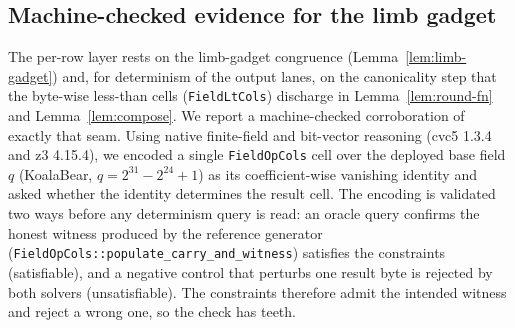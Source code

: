 


\subsection{Machine-checked evidence for the limb gadget}\label{app:machine-check}

The per-row layer rests on the limb-gadget congruence
(Lemma~\ref{lem:limb-gadget}) and, for determinism of the output lanes, on the
canonicality step that the byte-wise less-than cells (\texttt{FieldLtCols})
discharge in Lemma~\ref{lem:round-fn} and Lemma~\ref{lem:compose}. We report a
machine-checked corroboration of exactly that seam. Using native
finite-field and bit-vector reasoning (cvc5 1.3.4 and z3 4.15.4), we encoded a
single \texttt{FieldOpCols} cell over the deployed base field $q$ (KoalaBear,
$q=2^{31}-2^{24}+1$) as its coefficient-wise vanishing identity and asked
whether the identity determines the result cell. The encoding is validated two
ways before any determinism query is read: an oracle query confirms the honest
witness produced by the reference generator
(\texttt{FieldOpCols::populate\_carry\_and\_witness}) satisfies the constraints
(satisfiable), and a negative control that perturbs one result byte is rejected
by both solvers (unsatisfiable). The constraints therefore admit the intended
witness and reject a wrong one, so the check has teeth.


